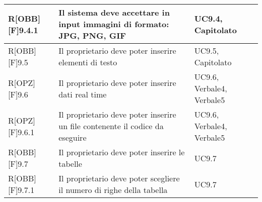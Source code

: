 \begin{table}[h]
\begin{tabular}{|p{}|p{}|p{}|}
R[OBB][F]9.4.1 & Il sistema deve accettare in input immagini di formato: JPG, PNG, GIF & UC9.4, Capitolato \\ \midrule
R[OBB][F]9.5 & Il proprietario deve poter inserire elementi di testo & UC9.5, Capitolato \\ \midrule
R[OPZ][F]9.6 & Il proprietario deve poter inserire dati real time & UC9.6, Verbale4, Verbale5 \\ \midrule
R[OPZ][F]9.6.1 & Il proprietario deve poter inserire un file contenente il codice da eseguire  & UC9.6, Verbale4, Verbale5 \\ \midrule
R[OBB][F]9.7 & Il proprietario deve poter inserire le tabelle & UC9.7 \\ \midrule
R[OBB][F]9.7.1 & Il proprietario deve poter scegliere il numero di righe della tabella & UC9.7 \\ \midrule

		\end{tabular}
	\end{table}
	\newpage
	
